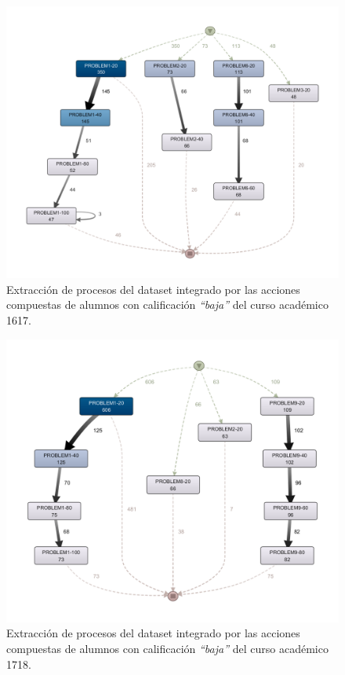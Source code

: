 \begin{figure}[H]
    \centering
    \includegraphics[width=1.25\textwidth]{imagenes/Year1617WorstGrades.png}
    \caption{Extracción de procesos del dataset integrado por las acciones compuestas de alumnos con calificación \emph{``baja''} del curso académico 1617.}
    \label{fig:year1617WorstGrades}
\end{figure}

\begin{figure}[H]
    \centering
    \includegraphics[width=1.25\textwidth]{imagenes/Year1718WorstGrades.png}
    \caption{Extracción de procesos del dataset integrado por las acciones compuestas de alumnos con calificación \emph{``baja''} del curso académico 1718.}
    \label{fig:year1718WorstGrades}
\end{figure}

